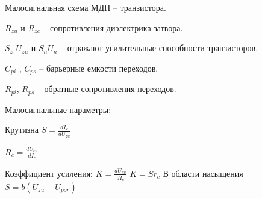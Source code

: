 \documentclass[12pt,a4paper]{article}
\begin{document}
Малосигнальная схема МДП – транзистора.
\begin{center}
\begin{figure}[h!]
		\label{}
	\end{figure}
\end{center}
$R_{zu}$ и $R_{zc}$ – сопротивления диэлектрика затвора.

$S_{z}$ $U_{zu}$ и $S_n U_n$ – отражают усилительные способности транзисторов.
\pagebreak
\begin{center}
\begin{figure}[h!]
		\label{}
	\end{figure}
\end{center}
$C_{pi}$ , $C_{ps}$ – барьерные емкости переходов.

$R_{pi}$, $R_{ps}$ – обратные сопротивления переходов.

Малосигнальные параметры:

Крутизна $S=\frac{dI_c}{dU_{zu}}$

$R_c = \frac{dU_{cu}}{dI_c}$

Коэффициент усиления: $K=\frac{ dU_{cu} }{dI_c}$
$K=Sr_c$
В области насыщения $S=b(U_{zu} - U_{por})$
\end{document}
